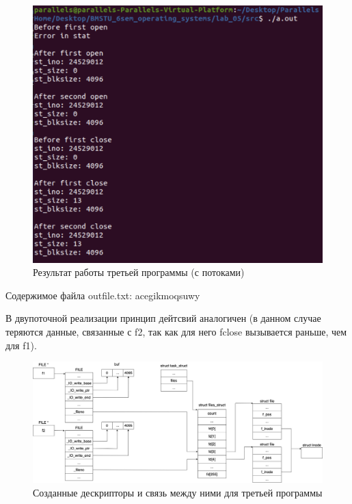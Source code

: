 \documentclass[12pt]{report}
\begin{document}
\begin{figure}[H]
	\centering
	\includegraphics[scale=0.6]{img/prog_03_thread.png}
	\caption{Результат работы третьей программы (с потоками)}
	\label{fig:prog_03_thread}
\end{figure}

Содержимое файла outfile.txt: acegikmoqsuwy

В двупоточной реализации принцип дейтсвий аналогичен (в данном случае теряются данные, связанные с f2, так как для него fclose вызывается раньше, чем для f1).



\begin{figure}[H]
	\centering
	\includegraphics[scale=0.3]{img/prog_03_schema.jpg}
	\caption{Созданные дескрипторы и связь между ними для третьей программы}
	\label{fig:prog_03_schema}
\end{figure}





	
\end{document}
